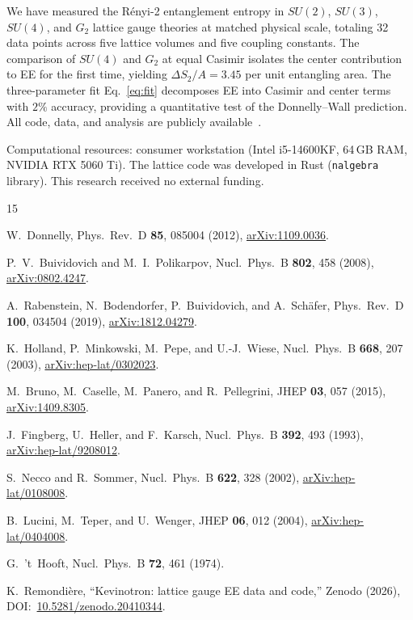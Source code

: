\documentclass[twocolumn,prl,nofootinbib,superscriptaddress]{revtex4-2}
\begin{document}
We have measured the R\'enyi-2 entanglement entropy in $SU(2)$, $SU(3)$, $SU(4)$, and $G_2$ lattice gauge theories at matched physical scale, totaling 32 data points across five lattice volumes and five coupling constants.  The comparison of $SU(4)$ and $G_2$ at equal Casimir isolates the center contribution to EE for the first time, yielding $\Delta S_2/A = 3.45$ per unit entangling area.  The three-parameter fit Eq.~\eqref{eq:fit} decomposes EE into Casimir and center terms with $2\%$ accuracy, providing a quantitative test of the Donnelly--Wall prediction.  All code, data, and analysis are publicly available~\cite{zenodo}.

\begin{acknowledgments}
Computational resources: consumer workstation (Intel i5-14600KF, 64\,GB RAM, NVIDIA RTX 5060 Ti).  The lattice code was developed in Rust (\texttt{nalgebra} library).  This research received no external funding.
\end{acknowledgments}

\begin{thebibliography}{15}

W.~Donnelly,
Phys.\ Rev.\ D \textbf{85}, 085004 (2012),
\href{https://arxiv.org/abs/1109.0036}{arXiv:1109.0036}.

P.~V.~Buividovich and M.~I.~Polikarpov,
Nucl.\ Phys.\ B \textbf{802}, 458 (2008),
\href{https://arxiv.org/abs/0802.4247}{arXiv:0802.4247}.

A.~Rabenstein, N.~Bodendorfer, P.~Buividovich, and A.~Sch\"afer,
Phys.\ Rev.\ D \textbf{100}, 034504 (2019),
\href{https://arxiv.org/abs/1812.04279}{arXiv:1812.04279}.

K.~Holland, P.~Minkowski, M.~Pepe, and U.-J.~Wiese,
Nucl.\ Phys.\ B \textbf{668}, 207 (2003),
\href{https://arxiv.org/abs/hep-lat/0302023}{arXiv:hep-lat/0302023}.

M.~Bruno, M.~Caselle, M.~Panero, and R.~Pellegrini,
JHEP \textbf{03}, 057 (2015),
\href{https://arxiv.org/abs/1409.8305}{arXiv:1409.8305}.

J.~Fingberg, U.~Heller, and F.~Karsch,
Nucl.\ Phys.\ B \textbf{392}, 493 (1993),
\href{https://arxiv.org/abs/hep-lat/9208012}{arXiv:hep-lat/9208012}.

S.~Necco and R.~Sommer,
Nucl.\ Phys.\ B \textbf{622}, 328 (2002),
\href{https://arxiv.org/abs/hep-lat/0108008}{arXiv:hep-lat/0108008}.

B.~Lucini, M.~Teper, and U.~Wenger,
JHEP \textbf{06}, 012 (2004),
\href{https://arxiv.org/abs/hep-lat/0404008}{arXiv:hep-lat/0404008}.

G.~'t~Hooft,
Nucl.\ Phys.\ B \textbf{72}, 461 (1974).

K.~Remondi\`ere, ``Kevinotron: lattice gauge EE data and code,''
Zenodo (2026), DOI:~\href{https://doi.org/10.5281/zenodo.20410344}{10.5281/zenodo.20410344}.

\end{thebibliography}
\end{document}
